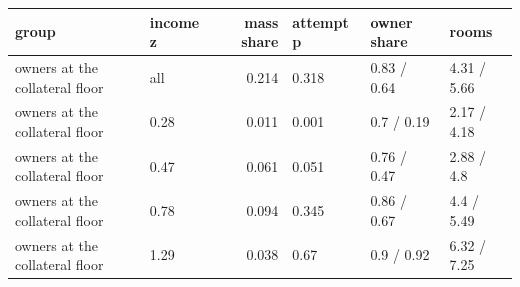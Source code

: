 \begingroup\small
\setlength{\tabcolsep}{3pt}
\renewcommand{\arraystretch}{1.04}
\begin{tabularx}{\linewidth}{XXrXXX}
\toprule
group & income z & mass share & attempt p & owner share & rooms \\
\midrule
owners at the collateral floor & all & 0.214 & 0.318 & 0.83 / 0.64 & 4.31 / 5.66 \\
owners at the collateral floor & 0.28 & 0.011 & 0.001 & 0.7 / 0.19 & 2.17 / 4.18 \\
owners at the collateral floor & 0.47 & 0.061 & 0.051 & 0.76 / 0.47 & 2.88 / 4.8 \\
owners at the collateral floor & 0.78 & 0.094 & 0.345 & 0.86 / 0.67 & 4.4 / 5.49 \\
owners at the collateral floor & 1.29 & 0.038 & 0.67 & 0.9 / 0.92 & 6.32 / 7.25 \\
\bottomrule
\end{tabularx}
\endgroup
